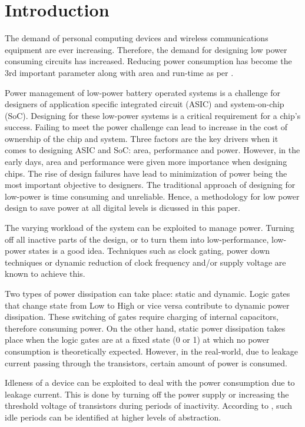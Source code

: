 \documentclass[conference]{IEEEtran}
\begin{document}
\section{Introduction}
\label{sec: introduction}
The demand of personal computing devices and wireless communications equipment are ever increasing. Therefore, the demand for designing low power consuming circuits has increased. Reducing power consumption has become the 3rd important parameter along with area and run-time as per \cite{Saraju01}. 

Power management of low-power battery operated systems is a challenge for designers of application specific integrated circuit (ASIC) and system-on-chip (SoC). Designing for these low-power systems is a critical requirement for a chip's success. Failing to meet the power challenge can lead to increase in the cost of ownership of the chip and system. Three factors are the key drivers when it comes to designing ASIC and SoC: area, performance and power. However, in the early days, area and performance were given more importance when designing chips. The rise of design failures have lead to minimization of power being the most important objective to designers. The traditional approach of designing for low-power is time consuming and unreliable. Hence, a methodology \cite{Ret} for low power design to save power at all digital levels is dicussed in this paper. 

The varying workload of the system can be exploited to manage power. Turning off all inactive parts of the design, or to turn them into low-performance, low-power states is a good idea. Techniques such as clock gating, power down techniques or dynamic reduction of clock frequency and/or supply voltage are known to achieve this. 

Two types of power dissipation can take place: static and dynamic. Logic gates that change state from Low to High or vice versa contribute to dynamic power dissipation. These switching of gates require charging of internal capacitors, therefore consuming power. On the other hand, static power dissipation takes place when the logic gates are at a fixed state (0 or 1) at which no power consumption is theoretically expected. However, in the real-world, due to leakage current passing through the transistors, certain amount of power is consumed. 

Idleness of a device can be exploited to deal with the power consumption due to leakage current. This is done by turning off the power supply or increasing the threshold voltage of transistors during periods of inactivity. According to \cite{Ret}, such idle periods can be identified at higher levels of abstraction. 
\end{document}
